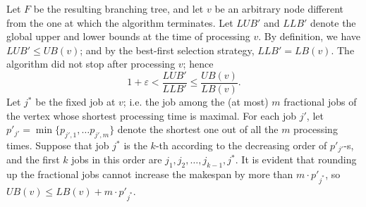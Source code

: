 \documentclass[moor,sglanonrev]{informs4}
\theoremstyle{plain}
\begin{document}



    Let $F$ be the resulting branching tree, and let $v$ be an arbitrary node different from the one at which the algorithm terminates. Let $LUB'$ and $LLB'$ denote the global upper and lower bounds at the time of processing $v$. By definition, we have $LUB' \le UB(v)$; and by the best-first selection strategy, $LLB'=LB(v)$. The algorithm did not stop after processing $v$; hence
    \[
    1+\varepsilon < \frac{LUB'}{LLB'}\le \frac{UB(v)}{LB(v)}.
    \]
    Let $j^*$ be the fixed job at $v$; i.e. the job among the (at most) $m$ fractional jobs of the vertex whose shortest processing time is maximal. For each job $j'$, let $p'_{j'} = \min\{p_{j',1}, \ldots p_{j', m}\}$ denote the shortest one out of all the $m$ processing times. Suppose that job $j^*$ is the $k$-th according to the decreasing order of $p'_{j'}$-s, and the first $k$ jobs in this order are $j_1, j_2, \ldots, j_{k-1}, j^*$. It is evident that rounding up the fractional jobs cannot increase the makespan by more than $m\cdot p'_{j^*}$, so $UB(v)\le LB(v)+m\cdot p'_{j^*}$.
\end{document}
